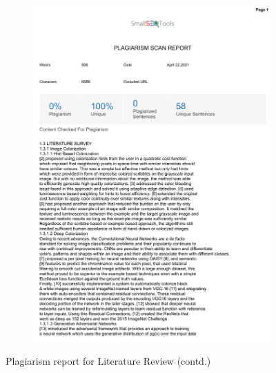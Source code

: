 \documentclass[oneside,a4paper,12pt]{report}
\begin{document}
\begin{appendices}
\begin{figure}
\begin{subfigure}[H]{\textwidth}
    	\includegraphics[scale=0.7, page=2]{plagiarism/literature_survey.pdf}
    \end{subfigure}
    \caption{Plagiarism report for Literature Review (contd.)}
    \label{PlagiarismLitSurvey2}
\end{figure}


\end{appendices}
\end{document}
